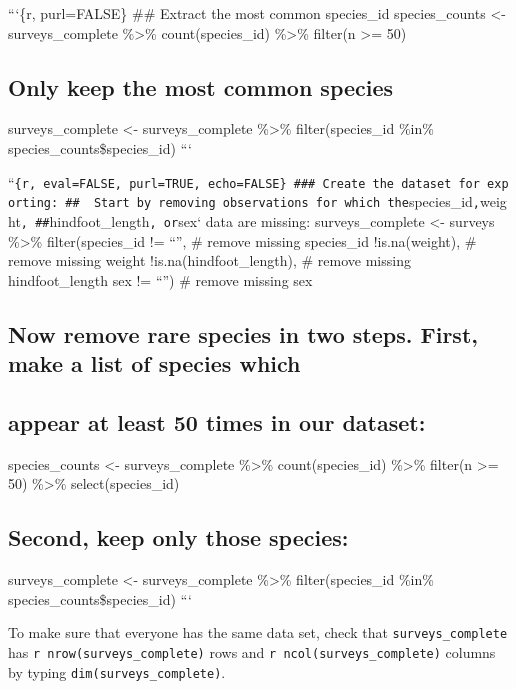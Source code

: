 \documentclass[]{article}
\begin{document}
```\{r, purl=FALSE\} \#\# Extract the most common species\_id
species\_counts \textless{}- surveys\_complete \%\textgreater{}\%
count(species\_id) \%\textgreater{}\% filter(n \textgreater{}= 50)

\subsection{Only keep the most common
species}\label{only-keep-the-most-common-species}

surveys\_complete \textless{}- surveys\_complete \%\textgreater{}\%
filter(species\_id \%in\% species\_counts\$species\_id) ```

``\texttt{\{r,\ eval=FALSE,\ purl=TRUE,\ echo=FALSE\}\ \#\#\#\ Create\ the\ dataset\ for\ exporting:\ \#\#\ \ Start\ by\ removing\ observations\ for\ which\ the}species\_id\texttt{,}weight\texttt{,\ \#\#}hindfoot\_length\texttt{,\ or}sex`
data are missing: surveys\_complete \textless{}- surveys
\%\textgreater{}\% filter(species\_id != ``'', \# remove missing
species\_id !is.na(weight), \# remove missing weight
!is.na(hindfoot\_length), \# remove missing hindfoot\_length sex !=
``'') \# remove missing sex

\subsection{Now remove rare species in two steps. First, make a list of
species
which}\label{now-remove-rare-species-in-two-steps.-first-make-a-list-of-species-which}

\subsection{appear at least 50 times in our
dataset:}\label{appear-at-least-50-times-in-our-dataset}

species\_counts \textless{}- surveys\_complete \%\textgreater{}\%
count(species\_id) \%\textgreater{}\% filter(n \textgreater{}= 50)
\%\textgreater{}\% select(species\_id)

\subsection{Second, keep only those
species:}\label{second-keep-only-those-species}

surveys\_complete \textless{}- surveys\_complete \%\textgreater{}\%
filter(species\_id \%in\% species\_counts\$species\_id) ```

To make sure that everyone has the same data set, check that
\texttt{surveys\_complete} has \texttt{r\ nrow(surveys\_complete)} rows
and \texttt{r\ ncol(surveys\_complete)} columns by typing
\texttt{dim(surveys\_complete)}.
\end{document}
